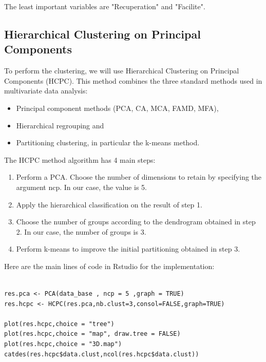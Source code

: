 \documentclass[12pt]{article}
\begin{document}
The least important variables are "Recuperation" and "Facilite".

\newpage   


\subsection{Hierarchical Clustering on Principal Components}

To perform the clustering, we will use Hierarchical Clustering on Principal Components (HCPC).
This method combines the three standard methods used in multivariate data analysis:

    
 \begin{itemize}
    \item  Principal component methods (PCA, CA, MCA, FAMD, MFA),
    \item  Hierarchical regrouping and
    \item  Partitioning clustering, in particular the k-means method.
 \end{itemize}

\vspace{0.2 cm}

The HCPC method algorithm has 4 main steps:

\begin{enumerate}
    \item  Perform a PCA. Choose the number of dimensions to retain by specifying the argument ncp. In our case, the value is 5.
    \item Apply the hierarchical classification on the result of step 1.
    \item Choose the number of groups according to the dendrogram obtained in step 2. In our case, the number of groups is 3.
    \item Perform k-means to improve the initial partitioning obtained in step 3.
\end{enumerate}



Here are the main lines of code in Rstudio for the implementation:

\begin{lstlisting}

res.pca <- PCA(data_base , ncp = 5 ,graph = TRUE)
res.hcpc <- HCPC(res.pca,nb.clust=3,consol=FALSE,graph=TRUE)

plot(res.hcpc,choice = "tree")
plot(res.hcpc,choice = "map", draw.tree = FALSE)
plot(res.hcpc,choice = "3D.map")
catdes(res.hcpc$data.clust,ncol(res.hcpc$data.clust))

\end{lstlisting}
\end{document}
